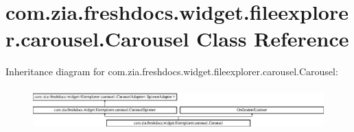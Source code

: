 \hypertarget{classcom_1_1zia_1_1freshdocs_1_1widget_1_1fileexplorer_1_1carousel_1_1_carousel}{\section{com.\-zia.\-freshdocs.\-widget.\-fileexplorer.\-carousel.\-Carousel Class Reference}
\label{classcom_1_1zia_1_1freshdocs_1_1widget_1_1fileexplorer_1_1carousel_1_1_carousel}
}
Inheritance diagram for com.\-zia.\-freshdocs.\-widget.\-fileexplorer.\-carousel.\-Carousel\-:\begin{figure}[H]
\begin{center}
\leavevmode
\includegraphics[height=1.650295cm]{classcom_1_1zia_1_1freshdocs_1_1widget_1_1fileexplorer_1_1carousel_1_1_carousel}
\end{center}
\end{figure}
